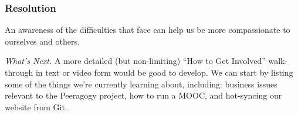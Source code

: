\subsubsection*{Resolution}
An awareness of the difficulties that  face can
help us be more compassionate to ourselves and others.

\begin{framed}
\emph{What's Next.}
A more detailed (but non-limiting) ``How to Get Involved'' walk-through in text or video form would be good to develop. We can start by listing some of the things we're currently learning about, including: business issues relevant to the Peeragogy project, how to run a MOOC, and hot-syncing our website from Git.
\end{framed}


